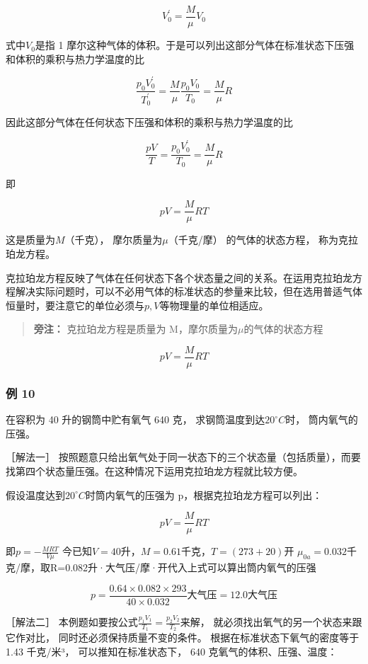 \[
V _ {0} ^ {\prime} = \frac {M}{\mu} V _ {0}
\]

式中\(V_{0}\)是指 1
摩尔这种气体的体积。于是可以列出这部分气体在标准状态下压强和体积的乘积与热力学温度的比

\[
\frac {p _ {0} V _ {0} ^ {\prime}}{T _ {0} ^ {\prime}} = \frac {M}{\mu} \frac {p _ {0} V _ {0}}{T _ {0}} = \frac {M}{\mu} R
\]

因此这部分气体在任何状态下压强和体积的乘积与热力学温度的比

\[
\frac {p V}{T} = \frac {p _ {0} V _ {0} ^ {\prime}}{T _ {0}} = \frac {M}{\mu} R
\]

即

\[
p V = \frac {M}{\mu} R T \tag {5.12}
\]

这是质量为\(M\)（千克）， 摩尔质量为\(\mu\)（千克/摩）
的气体的状态方程， 称为克拉珀龙方程。

克拉珀龙方程反映了气体在任何状态下各个状态量之间的关系。在运用克拉珀龙方程解决实际问题时，可以不必用气体的标准状态的参量来比较，但在选用普适气体恒量时，要注意它的单位必须与\(p, V\)等物理量的单位相适应。

\begin{quote}
\textbf{旁注：} 克拉珀龙方程是质量为
M，摩尔质量为\(\mu\)的气体的状态方程
\end{quote}

\[
p V = \frac {M}{\mu} R T
\]

\subsubsection{例 10}\label{ux4f8b-10-1}

在容积为 40 升的钢筒中贮有氧气 640 克，
求钢筒温度到达\(20^{\circ}C\)时， 筒内氧气的压强。

［解法一］
按照题意只给出氧气处于同一状态下的三个状态量（包括质量），而要找第四个状态量压强。在这种情况下运用克拉珀龙方程就比较方便。

假设温度达到\(20^{\circ}C\)时筒内氧气的压强为
p，根据克拉珀龙方程可以列出：

\[
pV=\frac{M}{\mu}RT
\]

即\(p = -\frac{MRT}{V\mu}\)
今已知\(V = 40\)升，\(M = 0.61\)千克，\(T = (273 + 20)\)开
\(\mu_{0a}=0.032\)千克/摩，取R=0.082升·大气压/摩·开代入上式可以算出筒内氧气的压强

\[
p = \frac {0.64 \times 0.082 \times 293}{40 \times 0.032} \text{大气压} = 12.0 \text{大气压}
\]

［解法二］
本例题如要按公式\(\frac{p_1V_1}{T_1} = \frac{p_2V_2}{T_2}\)来解，
就必须找出氧气的另一个状态来跟它作对比， 同时还必须保持质量不变的条件。
根据在标准状态下氧气的密度等于 1.43 千克/米³， 可以推知在标准状态下，
640 克氧气的体积、压强、温度：

